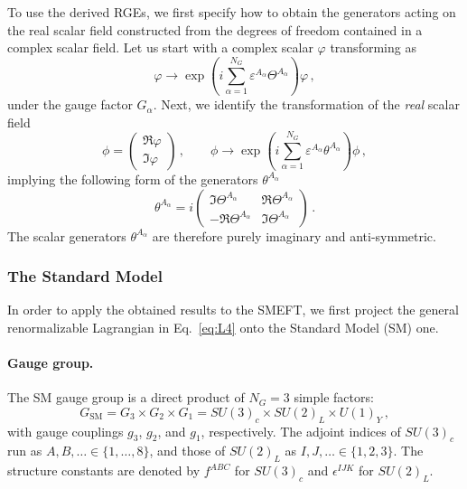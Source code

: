 To use the derived RGEs, we first specify how to obtain the generators acting on the real scalar field constructed from the degrees of freedom contained in a complex scalar field. 
Let us start with a complex scalar $\varphi$ transforming as 
\begin{equation}
    \varphi \rightarrow \exp(i\sum_{\alpha=1}^{N_G}\varepsilon^{A_{\alpha}} \Theta^{A_\alpha})\varphi\,,
\end{equation}
under the gauge factor $G_\alpha$. Next, we identify the transformation of the \emph{real} scalar field 
\begin{equation}
    \phi = \begin{pmatrix}
        \Re \varphi \\
        \Im \varphi
    \end{pmatrix}\,,\qquad \phi \rightarrow \exp(i\sum_{\alpha=1}^{N_G}\varepsilon^{A_{\alpha}} \theta^{A_\alpha})\phi\,,
\end{equation}
implying the following form of the generators $\theta^{A_\alpha}$ 
\begin{equation}
    \theta^{A_\alpha} = i\begin{pmatrix}
        \Im \Theta^{A_\alpha} & \Re \Theta^{A_\alpha} \\
        -\Re \Theta^{A_\alpha} & \Im \Theta^{A_\alpha}
    \end{pmatrix}\,.
    \label{eq:real_generators}
\end{equation}
The scalar generators $\theta^{A_\alpha}$ are therefore purely imaginary and anti-symmetric.

\subsubsection{The Standard Model}

In order to apply the obtained results to the SMEFT, we first project the general renormalizable Lagrangian in Eq.~\eqref{eq:L4} onto the Standard Model (SM) one.

\paragraph{Gauge group.}

The SM gauge group is a direct product of $N_G=3$ simple factors:
\begin{equation}\label{eq:SM_gauge_group}
    G_{\text{SM}} = G_3 \times G_2 \times G_1 = SU(3)_c \times SU(2)_L \times U(1)_Y\,,
\end{equation}
with gauge couplings $g_3$, $g_2$, and $g_1$, respectively. The adjoint indices of $SU(3)_c$ run as $A,B,\dotsc \in \{1,\dotsc,8\}$, and those of $SU(2)_L$ as $I,J,\dotsc \in \{1,2,3\}$. The structure constants are denoted by $f^{ABC}$ for $SU(3)_c$ and $\epsilon^{IJK}$ for $SU(2)_L$.

